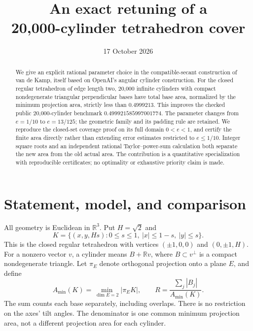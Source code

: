 \documentclass[11pt]{article}
\title{An exact retuning of a\\20,000-cylinder tetrahedron cover}
\author{}
\date{17 October 2026}
\newcommand{\R}{\mathbb R}
\newcommand{\Amin}{A_{\min}}
\begin{document}
\maketitle


\begin{abstract}
We give an explicit rational parameter choice in the compatible-secant
construction of van de Kamp, itself based on OpenAI's angular cylinder
construction. For the closed regular tetrahedron of edge length two,
20,000 infinite cylinders with compact nondegenerate triangular perpendicular
bases have total base area, normalized by the minimum projection area,
strictly less than \(0.4999213\). This improves the checked public
20,000-cylinder benchmark \(0.499921585997001774\).
The parameter changes from \(e=1/10\) to \(e=13/125\); the geometric
family and its padding rule are retained. We reproduce the closed-set
coverage proof on its full domain \(0<e<1\), and certify the finite area
directly rather than extending error estimates restricted to \(e\le1/10\).
Integer square roots and an independent rational Taylor--power-sum
calculation both separate the new area from the old actual area.
The contribution is a quantitative specialization with reproducible
certificates; no optimality or exhaustive priority claim is made.
\end{abstract}

\section{Statement, model, and comparison}
All geometry is Euclidean in \(\R^3\). Put \(H=\sqrt2\) and
\begin{equation}\label{eq:K}
 K=\{(x,y,Hs):0\le s\le1,\ |x|\le1-s,\ |y|\le s\}.
\end{equation}
This is the closed regular tetrahedron with vertices
\((\pm1,0,0)\) and \((0,\pm1,H)\).
For a nonzero vector \(v\), a cylinder means \(B+\R v\),
where \(B\subset v^\perp\) is a compact nondegenerate triangle.
Let \(\pi_E\) denote orthogonal projection onto a plane \(E\), and define
\[
 \Amin(K)=\min_{\dim E=2}|\pi_E K|,\qquad
 R=\frac{\sum_j |B_j|}{\Amin(K)}.
\]
The sum counts each base separately, including overlaps. There is no
restriction on the axes' tilt angles. The denominator is one common
minimum projection area, not a different projection area for each cylinder.
\end{document}
